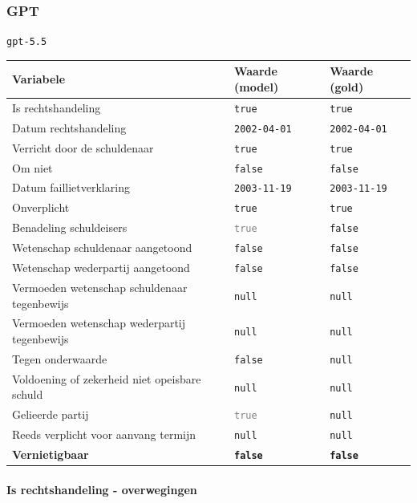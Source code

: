 \documentclass[
  dutch,
  a4paper,
]{article}
\begin{document}
\newpage


\subsubsection{GPT}\label{gpt-18}

\texttt{gpt-5.5}

\begin{center}
\small
\begin{tabular}{@{}p{7.4cm}p{2.6cm}p{2.6cm}@{}}
\toprule
Variabele & Waarde (model) & Waarde (gold) \\
\midrule
Is rechtshandeling & \texttt{true} & \texttt{true} \\
Datum rechtshandeling & \texttt{2002-04-01} & \texttt{2002-04-01} \\
Verricht door de schuldenaar & \texttt{true} & \texttt{true} \\
Om niet & \texttt{false} & \texttt{false} \\
Datum faillietverklaring & \texttt{2003-11-19} & \texttt{2003-11-19} \\
Onverplicht & \texttt{true} & \texttt{true} \\
Benadeling schuldeisers & \textcolor{gray}{\texttt{true}} & \texttt{false} \\
Wetenschap schuldenaar aangetoond & \texttt{false} & \texttt{false} \\
Wetenschap wederpartij aangetoond & \texttt{false} & \texttt{false} \\
Vermoeden wetenschap schuldenaar tegenbewijs & \texttt{null} & \texttt{null} \\
Vermoeden wetenschap wederpartij tegenbewijs & \texttt{null} & \texttt{null} \\
Tegen onderwaarde & \texttt{false} & \texttt{null} \\
Voldoening of zekerheid niet opeisbare schuld & \texttt{null} & \texttt{null} \\
Gelieerde partij & \textcolor{gray}{\texttt{true}} & \texttt{null} \\
Reeds verplicht voor aanvang termijn & \texttt{null} & \texttt{null} \\
\textbf{Vernietigbaar} & \textbf{\texttt{false}} & \textbf{\texttt{false}} \\
\bottomrule
\end{tabular}
\end{center}

\paragraph{Is rechtshandeling - overwegingen}\label{is-rechtshandeling---overwegingen-55}
\end{document}
